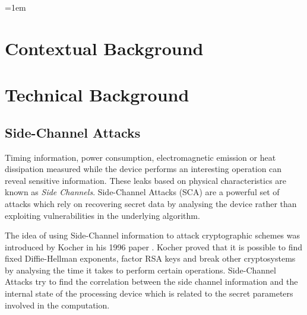 \documentclass[10pt,a4paper,twoside]{book}
\begin{document}
\noindent


\cleardoublepage
\pagestyle{marked}
\parindent=0in
\parskip=1em 



\chapter{Contextual Background}
\label{chap:context}



\chapter{Technical Background}
\label{chap:technical}


\section{Side-Channel Attacks}

Timing information, power consumption, electromagnetic emission or heat dissipation measured while the device performs an interesting operation can reveal sensitive information. These leaks based on physical characteristics are known as \textit{Side Channels}. Side-Channel Attacks (SCA) are a powerful set of attacks which rely on recovering secret data by analysing the device rather than exploiting vulnerabilities in the underlying algorithm. 

The idea of using Side-Channel information to attack cryptographic schemes was introduced by Kocher in his 1996 paper \cite{kocher1996timing}. Kocher proved that it is possible to find fixed Diffie-Hellman exponents, factor RSA keys and break other cryptosystems by analysing the time it takes to perform certain operations. Side-Channel Attacks try to find the correlation between the side channel information and the internal state of the processing device which is related to the secret parameters involved in the computation. 
\end{document}
